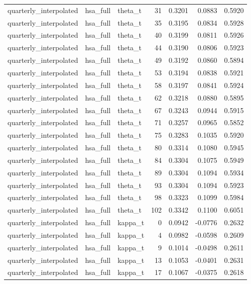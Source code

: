 \begin{tabular}{lllrrrr}
quarterly\_interpolated & hsa\_full & theta\_t & 31 & 0.3201 & 0.0883 & 0.5920 \\
quarterly\_interpolated & hsa\_full & theta\_t & 35 & 0.3195 & 0.0834 & 0.5928 \\
quarterly\_interpolated & hsa\_full & theta\_t & 40 & 0.3199 & 0.0811 & 0.5926 \\
quarterly\_interpolated & hsa\_full & theta\_t & 44 & 0.3190 & 0.0806 & 0.5923 \\
quarterly\_interpolated & hsa\_full & theta\_t & 49 & 0.3192 & 0.0860 & 0.5894 \\
quarterly\_interpolated & hsa\_full & theta\_t & 53 & 0.3194 & 0.0838 & 0.5921 \\
quarterly\_interpolated & hsa\_full & theta\_t & 58 & 0.3197 & 0.0841 & 0.5924 \\
quarterly\_interpolated & hsa\_full & theta\_t & 62 & 0.3218 & 0.0880 & 0.5895 \\
quarterly\_interpolated & hsa\_full & theta\_t & 67 & 0.3243 & 0.0944 & 0.5915 \\
quarterly\_interpolated & hsa\_full & theta\_t & 71 & 0.3257 & 0.0965 & 0.5852 \\
quarterly\_interpolated & hsa\_full & theta\_t & 75 & 0.3283 & 0.1035 & 0.5920 \\
quarterly\_interpolated & hsa\_full & theta\_t & 80 & 0.3314 & 0.1080 & 0.5945 \\
quarterly\_interpolated & hsa\_full & theta\_t & 84 & 0.3304 & 0.1075 & 0.5949 \\
quarterly\_interpolated & hsa\_full & theta\_t & 89 & 0.3304 & 0.1094 & 0.5934 \\
quarterly\_interpolated & hsa\_full & theta\_t & 93 & 0.3304 & 0.1094 & 0.5923 \\
quarterly\_interpolated & hsa\_full & theta\_t & 98 & 0.3323 & 0.1099 & 0.5984 \\
quarterly\_interpolated & hsa\_full & theta\_t & 102 & 0.3342 & 0.1100 & 0.6051 \\
quarterly\_interpolated & hsa\_full & kappa\_t & 0 & 0.0942 & -0.0776 & 0.2632 \\
quarterly\_interpolated & hsa\_full & kappa\_t & 4 & 0.0982 & -0.0598 & 0.2609 \\
quarterly\_interpolated & hsa\_full & kappa\_t & 9 & 0.1014 & -0.0498 & 0.2611 \\
quarterly\_interpolated & hsa\_full & kappa\_t & 13 & 0.1053 & -0.0401 & 0.2631 \\
quarterly\_interpolated & hsa\_full & kappa\_t & 17 & 0.1067 & -0.0375 & 0.2618 \\

\end{tabular}
